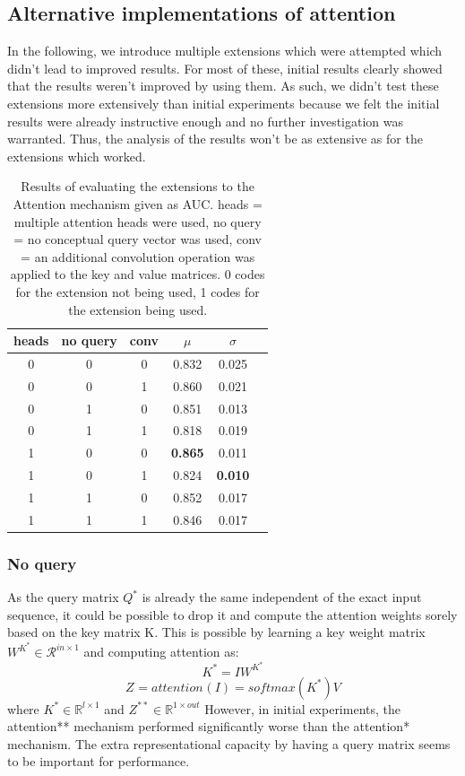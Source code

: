 \subsection{Alternative implementations of attention} \label{subsec:alternative_attention}
In the following, we introduce multiple extensions which were attempted which didn't lead to improved results. For most of these, initial results clearly showed that the results weren't improved by using them. As such, we didn't test these extensions more extensively than initial experiments because we felt the initial results were already instructive enough and no further investigation was warranted. Thus, the analysis of the results won't be as extensive as for the extensions which worked.

\begin{table}[h!]
	\centering
	\begin{tabular}{| c c c | c c | c} 
		\hline
		heads & no query & conv & $\mu$ & $\sigma$ \\
		\hline
		0 & 0 & 0 & 0.832 & 0.025 \\
		0 & 0 & 1 & 0.860 & 0.021 \\
		0 & 1 & 0 & 0.851 & 0.013 \\
		0 & 1 & 1 & 0.818 & 0.019 \\
		1 & 0 & 0 & \textbf{0.865} & 0.011 \\
		1 & 0 & 1 & 0.824 & \textbf{0.010} \\
		1 & 1 & 0 & 0.852 & 0.017 \\
		1 & 1 & 1 & 0.846 & 0.017 \\
		\hline
	\end{tabular}
	\caption{Results of evaluating the extensions to the Attention mechanism given as AUC. heads = multiple attention heads were used, no query = no conceptual query vector was used, conv = an additional convolution operation was applied to the key and value matrices. 0 codes for the extension not being used, 1 codes for the extension being used.
	}
	\label{table:attn_gridsearch}
\end{table}

\subsubsection{No query} \label{subsubsec:noquery}
As the query matrix ${Q}^*$ is already the same independent of the exact input sequence, it could be possible to drop it and compute the attention weights sorely based on the key matrix K.
This is possible by learning a key weight matrix $W^{K^*} \in \mathcal{R}^{in \times 1}$ and computing attention as:
$$K^* = IW^{K^*}$$
$$Z^{} = {attention}^{}(I) = softmax(K^*)V$$
where $K^* \in \mathbb{R}^{l \times 1}$ and $Z^{**} \in \mathbb{R}^{1 \times out}$
However, in initial experiments, the attention** mechanism performed significantly worse than the attention* mechanism. The extra representational capacity by having a query matrix seems to be important for performance.
